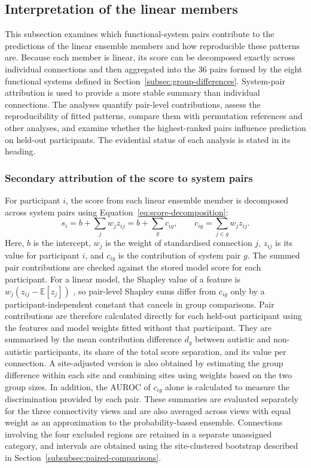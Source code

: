 \subsection{Interpretation of the linear members}
\label{subsec:interpretation}

This subsection examines which functional-system pairs contribute to the predictions of the linear ensemble members and how reproducible these patterns are. Because each member is linear, its score can be decomposed exactly across individual connections and then aggregated into the 36 pairs formed by the eight functional systems defined in Section~\ref{subsec:group-differences}. System-pair attribution is used to provide a more stable summary than individual connections. The analyses quantify pair-level contributions, assess the reproducibility of fitted patterns, compare them with permutation references and other analyses, and examine whether the highest-ranked pairs influence prediction on held-out participants. The evidential status of each analysis is stated in its heading.

\subsubsection{Secondary attribution of the score to system pairs}
\label{subsubsec:pair-contributions}

For participant $i$, the score from each linear ensemble member is decomposed across system pairs using Equation~\eqref{eq:score-decomposition}:
\begin{equation}
s_i
=
b + \sum_{j} w_j z_{ij}
=
b + \sum_{g} c_{ig},
\qquad
c_{ig} = \sum_{j\in g} w_j z_{ij}.
\label{eq:score-decomposition}
\end{equation}
Here, $b$ is the intercept, $w_j$ is the weight of standardised connection $j$, $z_{ij}$ is its value for participant $i$, and $c_{ig}$ is the contribution of system pair $g$. The summed pair contributions are checked against the stored model score for each participant. For a linear model, the Shapley value of a feature is $w_j\left(z_{ij}-\mathbb{E}[z_j]\right)$ \citep{LundbergLee2017}, so pair-level Shapley sums differ from $c_{ig}$ only by a participant-independent constant that cancels in group comparisons. Pair contributions are therefore calculated directly for each held-out participant using the features and model weights fitted without that participant. They are summarised by the mean contribution difference $d_g$ between autistic and non-autistic participants, its share of the total score separation, and its value per connection. A site-adjusted version is also obtained by estimating the group difference within each site and combining sites using weights based on the two group sizes. In addition, the AUROC of $c_{ig}$ alone is calculated to measure the discrimination provided by each pair. These summaries are evaluated separately for the three connectivity views and are also averaged across views with equal weight as an approximation to the probability-based ensemble. Connections involving the four excluded regions are retained in a separate unassigned category, and intervals are obtained using the site-clustered bootstrap described in Section~\ref{subsubsec:paired-comparisons}.

